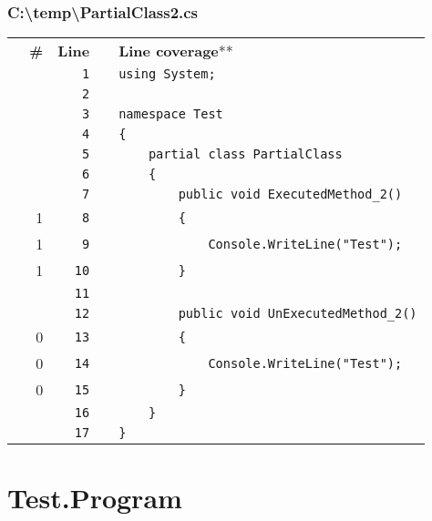 \documentclass[a4paper,landscape,10pt]{article}
\begin{document}
\subsubsection{C:\textbackslash temp\textbackslash PartialClass2.cs}
\begin{longtable}[l]{lrrll}
 & \textbf{\#} & \textbf{Line} & & \textbf{Line coverage}** \\
\cellcolor{gray} &  & \verb~1~ & & \verb~using System;~\\
\cellcolor{gray} &  & \verb~2~ & & \verb~~\\
\cellcolor{gray} &  & \verb~3~ & & \verb~namespace Test~\\
\cellcolor{gray} &  & \verb~4~ & & \verb~{~\\
\cellcolor{gray} &  & \verb~5~ & & \verb~    partial class PartialClass~\\
\cellcolor{gray} &  & \verb~6~ & & \verb~    {~\\
\cellcolor{gray} &  & \verb~7~ & & \verb~        public void ExecutedMethod_2()~\\
\cellcolor{green} & 1 & \verb~8~ & & \verb~        {~\\
\cellcolor{green} & 1 & \verb~9~ & & \verb~            Console.WriteLine("Test");~\\
\cellcolor{green} & 1 & \verb~10~ & & \verb~        }~\\
\cellcolor{gray} &  & \verb~11~ & & \verb~~\\
\cellcolor{gray} &  & \verb~12~ & & \verb~        public void UnExecutedMethod_2()~\\
\cellcolor{red} & 0 & \verb~13~ & & \verb~        {~\\
\cellcolor{red} & 0 & \verb~14~ & & \verb~            Console.WriteLine("Test");~\\
\cellcolor{red} & 0 & \verb~15~ & & \verb~        }~\\
\cellcolor{gray} &  & \verb~16~ & & \verb~    }~\\
\cellcolor{gray} &  & \verb~17~ & & \verb~}~\\
\end{longtable}
\newpage
\section{Test.Program}
\end{document}
